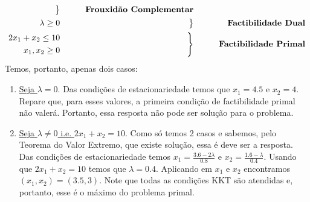 \begin{enumerate}
{\begin{align*}
         \left. \begin{aligned}
           \text{ }
        \end{aligned}  \right\rbrace && \qquad \text{\textbf{Frouxidão Complementar}}\\
        \begin{aligned}
            \lambda\ge0
        \end{aligned} &&
        \left. \begin{aligned}
           \text{ }
        \end{aligned}  \right\rbrace && \qquad \text{\textbf{Factibilidade Dual}}\\
        \begin{aligned}
            2x_1 + x_2\le10\\
            x_1,x_2\ge0
        \end{aligned} && 
        \left. \begin{aligned}
           \text{ }\\
           \text{ }
        \end{aligned}  \right\rbrace && \qquad \text{\textbf{Factibilidade Primal}}\\
    \end{align*}
    Temos, portanto, apenas dois casos:
    \begin{enumerate}
        \item[\textbf{Caso 1)}] \underline{Seja $\lambda=0$}. Das condições de estacionariedade temos que $x_1=4.5$ e $x_2 = 4$. Repare que, para esses valores, a primeira condição de factibilidade primal não valerá. Portanto, essa resposta não pode ser solução para o problema.
        \item[\textbf{Caso 2}] \underline{Seja $\lambda\neq0$ i.e. $2x_1 + x_2=10$}. Como só temos 2 casos e sabemos, pelo Teorema do Valor Extremo, que existe solução, essa é deve ser a resposta. Das condições de estacionariedade temos $x_1=\frac{3.6-2\lambda}{0.8}$ e $x_2=\frac{1.6-\lambda}{0.4}$. Usando que $2x_1 + x_2=10$ temos que $\lambda=0.4$. Aplicando em $x_1$ e $x_2$ encontramos $(x_1,x_2)=(3.5,3)$. Note que todas as condições KKT são atendidas e, portanto, esse é o máximo do problema primal.
    \end{enumerate}
    }
\end{enumerate}
